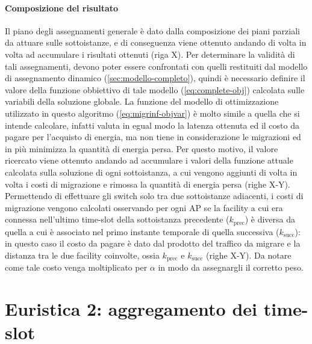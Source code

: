 \paragraph{Composizione del risultato}

Il piano degli assegnamenti generale è dato dalla composizione dei piani parziali da attuare sulle sottoistanze, e di conseguenza viene ottenuto andando di volta in volta ad accumulare i risultati ottenuti (riga X). Per determinare la validità di tali assegnamenti, devono poter essere confrontati con quelli restituiti dal modello di assegnamento dinamico (\autoref{sec:modello-completo}), quindi è necessario definire il valore della funzione obbiettivo di tale modello (\autoref{eq:complete-obj}) calcolata sulle variabili della soluzione globale. La funzione del modello di ottimizzazione utilizzato in questo algoritmo (\autoref{eq:migrinf-objvar}) è molto simile a quella che si intende calcolare, infatti valuta in egual modo la latenza ottenuta ed il costo da pagare per l'acquisto di energia, ma non tiene in considerazione le migrazioni ed in più minimizza la quantità di energia persa. Per questo motivo, il valore ricercato viene ottenuto andando ad accumulare i valori della funzione attuale calcolata sulla soluzione di ogni sottoistanza, a cui vengono aggiunti di volta in volta i costi di migrazione e rimossa la quantità di energia persa (righe X-Y). Permettendo di effettuare gli switch solo tra due sottoistanze adiacenti, i costi di migrazione vengono calcolati osservando per ogni AP se la facility a cui era connessa nell'ultimo time-slot della sottoistanza precedente ($k_{\text{prec}}$) è diversa da quella a cui è associato nel primo instante temporale di quella successiva ($k_{\text{succ}}$): in questo caso il costo da pagare è dato dal prodotto del traffico da migrare e la distanza tra le due facility coinvolte, ossia $k_{\text{prec}}$ e $k_{\text{succ}}$ (righe X-Y). Da notare come tale costo venga moltiplicato per $\alpha$ in modo da assegnargli il corretto peso.


%
%
\section{Euristica 2: aggregamento dei time-slot}
\label{sec:aggregamento-time-slot}

